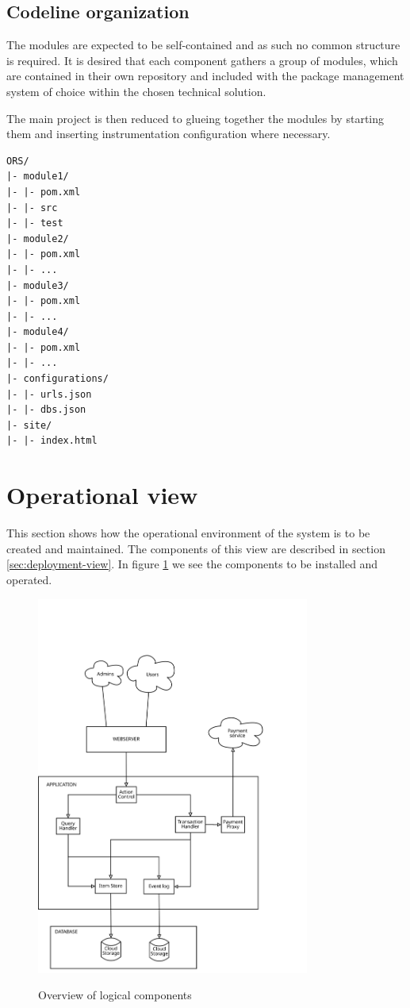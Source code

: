 \subsection{Codeline organization}
\label{sec:codel-organ}
The modules are expected to be self-contained and as such no common structure
is required. It is desired that each component gathers a group of modules,
which are contained in their own repository and included with the package
management system of choice within the chosen technical solution.

The main project is then reduced to glueing together the modules by starting
them and inserting instrumentation configuration where necessary.

\begin{verbatim}
ORS/
|- module1/
|- |- pom.xml
|- |- src
|- |- test
|- module2/
|- |- pom.xml
|- |- ...
|- module3/
|- |- pom.xml
|- |- ...
|- module4/
|- |- pom.xml
|- |- ...
|- configurations/
|- |- urls.json
|- |- dbs.json
|- site/
|- |- index.html
\end{verbatim}

\section{Operational view}
\label{sec:operational-view}
This section shows how the operational environment of the system is to be created and maintained. The components of this view are described in section \ref{sec:deployment-view}. In figure \ref{fig:logic_comp} we see the components to be installed and operated.

\begin{figure}[h!]
  \centering
  \caption{Overview of logical components}
  \includegraphics[width=0.8\textwidth]{figures/deployment_view}
  \label{fig:logic_comp}
\end{figure}


